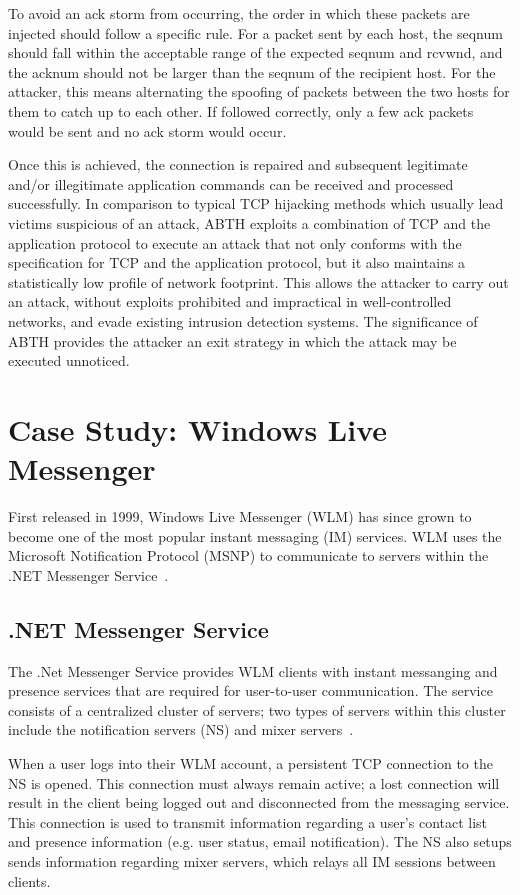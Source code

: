 \documentclass{sig-alternate}
\begin{document}
To avoid an ack storm from occurring, the order in which these packets are injected should follow a specific rule. For a packet sent by each host, the seqnum should fall within the acceptable range of the expected seqnum and rcvwnd, and the acknum should not be larger than the seqnum of the recipient host. For the attacker, this means alternating the spoofing of packets between the two hosts for them to catch up to each other. If followed correctly, only a few ack packets would be sent and no ack storm would occur.

Once this is achieved, the connection is repaired and subsequent legitimate and/or illegitimate application commands can be received and processed successfully. In comparison to typical TCP hijacking methods which usually lead victims suspicious of an attack, ABTH exploits a combination of TCP and the application protocol to execute an attack that not only conforms with the specification for TCP and the application protocol, but it also maintains a statistically low profile of network footprint. This allows the attacker to carry out an attack, without exploits prohibited and impractical in well-controlled networks, and evade existing intrusion detection systems.
The significance of ABTH provides the attacker an exit strategy in which the attack may be executed unnoticed.

\section{Case Study: Windows Live Messenger}

First released in 1999, Windows Live Messenger (WLM) has since grown to become one of the most popular instant messaging (IM) services. WLM uses the Microsoft Notification Protocol (MSNP) to communicate to servers within the .NET Messenger Service~\cite{piccard:imsecurity}.

\subsection{.NET Messenger Service}

The .Net Messenger Service provides WLM clients with instant messanging and presence services that are required for user-to-user communication. The service consists of a centralized cluster of servers; two types of servers within this cluster include the notification servers (NS) and mixer servers~\cite{torre:wlm}.

When a user logs into their WLM account, a persistent TCP connection to the NS is opened. This connection must always remain active; a lost connection will result in the client being logged out and disconnected from the messaging service. 
This connection is used to transmit information regarding a user's contact list and presence information (e.g. user status, email notification).
The NS also setups sends information regarding mixer servers, which relays all IM sessions between clients. 
\end{document}
